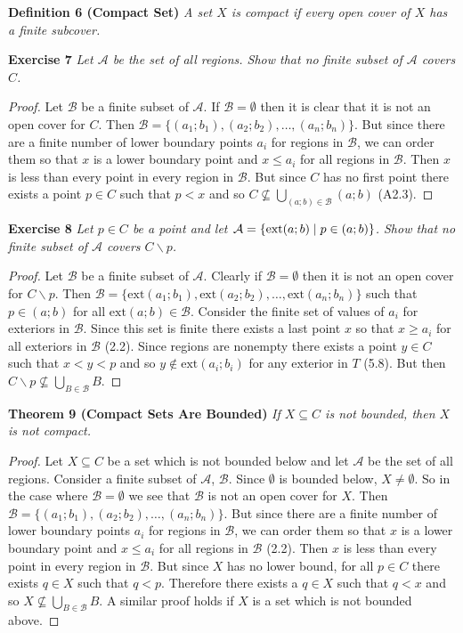 \documentclass{article}
\begin{document}
\begin{flushleft}
\textbf{Definition 6 (Compact Set)}
\textsl{A set $X$ is compact if every open cover of $X$ has a finite subcover.}\newline

\textbf{Exercise 7}
\textsl{Let $\mathcal{A}$ be the set of all regions. Show that no finite subset of $\mathcal{A}$ covers $C$.}
\begin{proof}
Let $\mathcal{B}$ be a finite subset of $\mathcal{A}$. If $\mathcal{B} = \emptyset$ then it is clear that it is not an open cover for $C$. Then $\mathcal{B}=\{(a_1;b_1),(a_2;b_2), \dots ,(a_n;b_n)\}$. But since there are a finite number of lower boundary points $a_i$ for regions in $\mathcal{B}$, we can order them so that $x$ is a lower boundary point and $x \leq a_i$ for all regions in $\mathcal{B}$. Then $x$ is less than every point in every region in $\mathcal{B}$. But since $C$ has no first point there exists a point $p \in C$ such that $p < x$ and so $C \nsubseteq \bigcup_{(a;b) \in \mathcal{B}} (a;b)$ (A2.3).
\end{proof}

\textbf{Exercise 8}
\textsl{Let $p \in C$ be a point and let $\mathcal{A}=\{ \textup{ext}(a;b) \mid p \in (a;b) \}$. Show that no finite subset of $\mathcal{A}$ covers $C \backslash p$.}
\begin{proof}
Let $\mathcal{B}$ be a finite subset of $\mathcal{A}$. Clearly if $\mathcal{B} = \emptyset$ then it is not an open cover for $C \backslash p$. Then $\mathcal{B}=\{ \text{ext}(a_1;b_1), \text{ext}(a_2;b_2), \dots ,\text{ext}(a_n;b_n) \}$ such that $p \in (a;b)$ for all $\text{ext}(a;b) \in \mathcal{B}$. Consider the finite set of values of $a_i$ for exteriors in $\mathcal{B}$. Since this set is finite there exists a last point $x$ so that $x \geq a_i$ for all exteriors in $\mathcal{B}$ (2.2). Since regions are nonempty there exists a point $y \in C$ such that $x<y<p$ and so $y \notin \text{ext}(a_i;b_i)$ for any exterior in $T$ (5.8). But then $C \backslash p \nsubseteq \bigcup_{B \in \mathcal{B}} B$.
\end{proof}

\textbf{Theorem 9 (Compact Sets Are Bounded)}
\textsl{If $X \subseteq C$ is not bounded, then $X$ is not compact.}
\begin{proof}
Let $X \subseteq C$ be a set which is not bounded below and let $\mathcal{A}$ be the set of all regions. Consider a finite subset of $\mathcal{A}$, $\mathcal{B}$. Since $\emptyset$ is bounded below, $X \neq \emptyset$. So in the case where $\mathcal{B} = \emptyset$ we see that $\mathcal{B}$ is not an open cover for $X$. Then $\mathcal{B}=\{(a_1;b_1),(a_2;b_2), \dots ,(a_n;b_n)\}$. But since there are a finite number of lower boundary points $a_i$ for regions in $\mathcal{B}$, we can order them so that $x$ is a lower boundary point and $x \leq a_i$ for all regions in $\mathcal{B}$ (2.2). Then $x$ is less than every point in every region in $\mathcal{B}$. But since $X$ has no lower bound, for all $p \in C$ there exists $q \in X$ such that $q < p$. Therefore there exists a $q \in X$ such that $q < x$ and so $X \nsubseteq \bigcup_{B \in \mathcal{B}} B$. A similar proof holds if $X$ is a set which is not bounded above.
\end{proof}


\end{flushleft}
\end{document}
